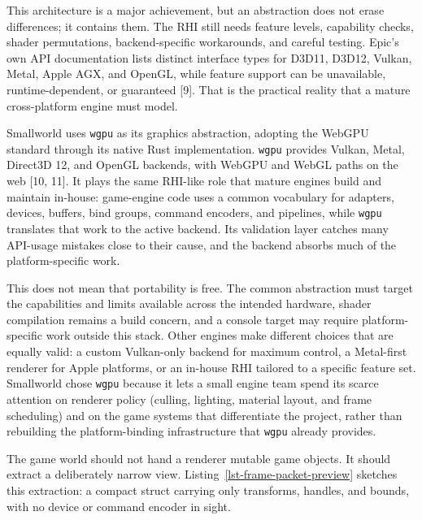 \documentclass[
  11pt,
  letterpaper,
  DIV=11,
  numbers=noendperiod,
  twoside,
  open=right]{scrreprt}
\begin{document}
This architecture is a major achievement, but an abstraction does not
erase differences; it contains them. The RHI still needs feature levels,
capability checks, shader permutations, backend-specific workarounds,
and careful testing. Epic's own API documentation lists distinct
interface types for D3D11, D3D12, Vulkan, Metal, Apple AGX, and OpenGL,
while feature support can be unavailable, runtime-dependent, or
guaranteed {[}9{]}. That is the practical reality that a mature
cross-platform engine must model.

Smallworld uses \texttt{wgpu} as its graphics abstraction, adopting the
WebGPU standard through its native Rust implementation. \texttt{wgpu}
provides Vulkan, Metal, Direct3D 12, and OpenGL backends, with WebGPU
and WebGL paths on the web {[}10, 11{]}. It plays the same RHI-like role
that mature engines build and maintain in-house: game-engine code uses a
common vocabulary for adapters, devices, buffers, bind groups, command
encoders, and pipelines, while \texttt{wgpu} translates that work to the
active backend. Its validation layer catches many API-usage mistakes
close to their cause, and the backend absorbs much of the
platform-specific work.

This does not mean that portability is free. The common abstraction must
target the capabilities and limits available across the intended
hardware, shader compilation remains a build concern, and a console
target may require platform-specific work outside this stack. Other
engines make different choices that are equally valid: a custom
Vulkan-only backend for maximum control, a Metal-first renderer for
Apple platforms, or an in-house RHI tailored to a specific feature set.
Smallworld chose \texttt{wgpu} because it lets a small engine team spend
its scarce attention on renderer policy (culling, lighting, material
layout, and frame scheduling) and on the game systems that differentiate
the project, rather than rebuilding the platform-binding infrastructure
that \texttt{wgpu} already provides.

The game world should not hand a renderer mutable game objects. It
should extract a deliberately narrow view.
Listing~\ref{lst-frame-packet-preview} sketches this extraction: a
compact struct carrying only transforms, handles, and bounds, with no
device or command encoder in sight.
\end{document}
